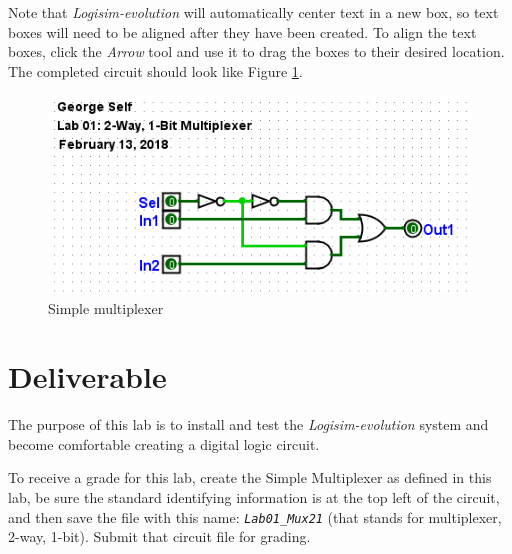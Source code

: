 Note that \textit{Logisim-evolution} will automatically center text in a new box, so text boxes will need to be aligned after they have been created. To align the text boxes, click the \textit{Arrow} tool and use it to drag the boxes to their desired location. The completed circuit should look like Figure \ref{fig:01-08}.

\begin{figure}[H]
	\centering
	\includegraphics[width=\maxwidth{.95\linewidth}]{gfx/01-08}
	\caption{Simple multiplexer}
	\label{fig:01-08}
\end{figure}

\section{Deliverable}

The purpose of this lab is to install and test the \textit{Logisim-evolution} system and become comfortable creating a digital logic circuit. 

To receive a grade for this lab, create the Simple Multiplexer as defined in this lab, be sure the standard identifying information is at the top left of the circuit, and then save the file with this name: \textit{\texttt{Lab01\_Mux21}} (that stands for multiplexer, 2-way, 1-bit). Submit that circuit file for grading.


